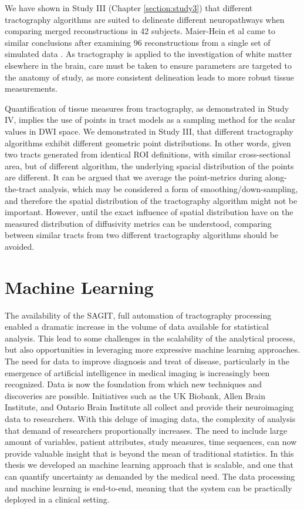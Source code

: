 We have shown in Study III (Chapter \ref{section:study3}) that different tractography algorithms are suited to delineate different neuropathways when comparing merged reconstructions in 42 subjects. Maier-Hein et al came to similar conclusions after examining 96 reconstructions from a single set of simulated data \cite{Maier-Hein2017}. As tractography is applied to the investigation of white matter elsewhere in the brain, care must be taken to ensure  parameters are targeted to the anatomy of study, as more consistent delineation leads to more robust tissue measurements.

Quantification of tissue measures from tractography, as demonstrated in Study IV, implies the use of points in tract models as a sampling method for the scalar values in DWI space. We demonstrated in Study III, that different tractography algorithms exhibit different geometric point distributions. In other words, given two tracts generated from identical ROI definitions, with similar cross-sectional area, but of different algorithm, the underlying spacial distribution of the points are different. It can be argued that we average the point-metrics during along-the-tract analysis, which may be considered a form of smoothing/down-sampling, and therefore the spatial distribution of the tractography algorithm might not be important. However, until the exact influence of spatial distribution have on the measured distribution of diffusivity metrics can be understood, comparing between similar tracts from two different tractography algorithms should be avoided.

\section{Machine Learning}


The availability of the SAGIT, full automation of tractography processing enabled a dramatic increase in the volume of data available for statistical analysis. This lead to some challenges in the scalability of the analytical process, but also opportunities in leveraging more expressive machine learning approaches. The need for data to improve diagnosis and treat of disease, particularly in the emergence of artificial intelligence in medical imaging is increasingly been recognized. Data is now the foundation from which new techniques and discoveries are possible. Initiatives such as the UK Biobank, Allen Brain Institute, and Ontario Brain Institute all collect and provide their neuroimaging data to researchers. With this deluge of imaging data, the complexity of analysis that demand of researchers proportionally increases. The need to include large amount of variables, patient attributes, study measures, time sequences, can now provide valuable insight that is beyond the mean of traditional statistics. In this thesis we developed an machine learning approach that is scalable, and one that can quantify uncertainty as demanded by the medical need. The data processing and machine learning is end-to-end, meaning that the system can be practically deployed in a clinical setting.

